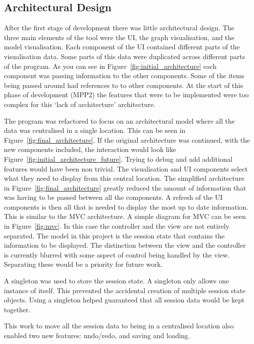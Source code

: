 \subsection{Architectural Design}
\label{sec:architecture}
After the first stage of development there was little architectural design.  The three main elements of the tool were the \ac{UI}, the graph visualisation, and the model visualisation.  Each component of the \ac{UI} contained different parts of the visualisation data.  Some parts of this data were duplicated across different parts of the program.   As you can see in Figure~\ref{fig:initial_architecture} each component was passing information to the other components.  Some of the items being passed around had references to to other components.  At the start of this phase of development (MPP2) the features that were to be implemented were too complex for this `lack of architecture' architecture.

The program was refactored to focus on an architectural model where all the data was centralised in a single location.  This can be seen in Figure~\ref{fig:final_architecture}.  If the original architecture was continued, with the new components included, the interaction would look like Figure~\ref{fig:initial_architecture_future}.  Trying to debug and add additional features would have been non trivial.  The visualisation and \ac{UI} components select what they need to display from this central location.  The simplified architecture in Figure~\ref{fig:final_architecture} greatly reduced the amount of information that was having to be passed between all the components.  A refresh of the \ac{UI} components is then all that is needed to display the most up to date information.  This is similar to the \ac{MVC} architecture.  A simple diagram for \ac{MVC} can be seen in Figure~\ref{fig:mvc}.  In this case the controller and the view are not entirely separated.  The model in this project is the session state that contains the information to be displayed.  The distinction between the view and the controller is currently blurred with some aspect of control being handled by the view.  Separating these would be a priority for future work.

A singleton was used to store the session state.  A singleton only allows one instance of itself.  This prevented the accidental creation of multiple session state objects.  Using a singleton helped guaranteed that all session data would be kept together.

This work to move all the session data to being in a centralised location also enabled two new features: undo/redo, and saving and loading.

